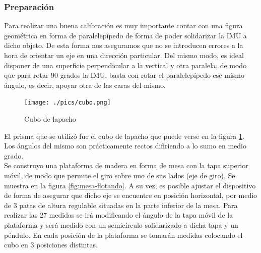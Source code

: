 \documentclass[spanish,12pt,a4paper,titlepage]{report}
\begin{document}
\subsubsection*{Preparación}
Para realizar una buena calibración es muy importante contar con una figura geométrica en forma de paralelepípedo de forma de poder solidarizar la IMU a dicho objeto. De esta forma nos aseguramos que no se introducen errores a la hora de orientar un eje en una dirección particular. Del mismo modo, es ideal disponer de una superficie perpendicular a la vertical y otra paralela, de modo que para rotar 90 grados la IMU, basta con rotar el paralelepípedo ese mismo ángulo, es decir, apoyar otra de las caras del mismo. \\

\begin{figure}
  \vspace{-20pt}
  \begin{center}
    \texttt{[image: ./pics/cubo.png]}
  \end{center}
  \vspace{-20pt}
  \caption{Cubo de lapacho}
  \label{fig:cubo}
\end{figure}

El prisma que se utilizó fue el cubo de lapacho que puede verse en la figura \ref{fig:cubo}. \\
Los ángulos del mismo son prácticamente rectos difiriendo a lo sumo en medio grado. \\

Se construyo una plataforma de madera en forma de mesa con la tapa superior móvil, de modo que permite el giro sobre uno de sus lados (eje de giro). Se muestra en la figura \ref{fig:mesa-flotando}.  A su vez, es posible ajustar el dispositivo de forma de asegurar que dicho eje se encuentre en posición horizontal, por medio de 3 patas de altura regulable situadas en la parte inferior de la mesa. Para realizar las 27 medidas se irá modificando el ángulo de la tapa móvil de la plataforma y será medido con un semicírculo solidarizado a dicha tapa y un péndulo. En cada posición de la plataforma se tomarán medidas colocando el cubo en 3 posiciones distintas.
\end{document}

